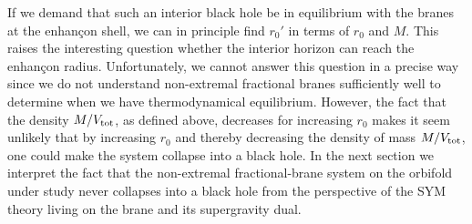\documentclass[a4paper,11pt]{article}
\begin{document}
If we demand that such an interior black hole be in equilibrium with
the branes at the enhan\c{c}on shell, we can in principle find $r_0'$
in terms of $r_0$ and $M$. This raises the interesting question
whether the interior horizon can reach the enhan\c{c}on
radius. Unfortunately, we cannot answer this question in a precise way
since we do not understand non-extremal fractional branes sufficiently
well to determine when we have thermodynamical equilibrium. However,
the fact that the density $M/V_{\rm tot}$, as defined above, decreases
for increasing $r_0$ makes it seem unlikely that by increasing $r_0$
and thereby decreasing the density of mass $M/V_{\rm tot}$, one could
make the system collapse into a black hole. In the next section we
interpret the fact that the non-extremal fractional-brane system on
the orbifold under study never collapses into a black hole from the
perspective of the SYM theory living on the brane and its supergravity
dual.
\end{document}
